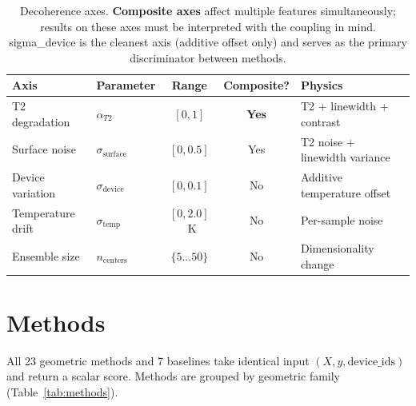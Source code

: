 \documentclass[11pt]{article}
\begin{document}
\begin{table}[t]
\centering
\caption{Decoherence axes.  \textbf{Composite axes} affect multiple
  features simultaneously; results on these axes must be interpreted
  with the coupling in mind.  sigma\_device is the cleanest axis
  (additive offset only) and serves as the primary discriminator
  between methods.}
\label{tab:axes}
\begin{tabular}{@{}llccl@{}}
\toprule
Axis & Parameter & Range & Composite? & Physics \\
\midrule
T2 degradation & $\alpha_{T2}$ & $[0, 1]$ & \textbf{Yes} & T2 + linewidth + contrast \\
Surface noise & $\sigma_\text{surface}$ & $[0, 0.5]$ & Yes & T2 noise + linewidth variance \\
Device variation & $\sigma_\text{device}$ & $[0, 0.1]$ & No & Additive temperature offset \\
Temperature drift & $\sigma_\text{temp}$ & $[0, 2.0]$~K & No & Per-sample noise \\
Ensemble size & $n_\text{centers}$ & $\{5 \ldots 50\}$ & No & Dimensionality change \\
\bottomrule
\end{tabular}
\end{table}

\section{Methods}
\label{sec:methods}

All 23 geometric methods and 7 baselines take identical input
$(X, y, \text{device\_ids})$ and return a scalar score.  Methods are
grouped by geometric family (Table~\ref{tab:methods}).
\end{document}
